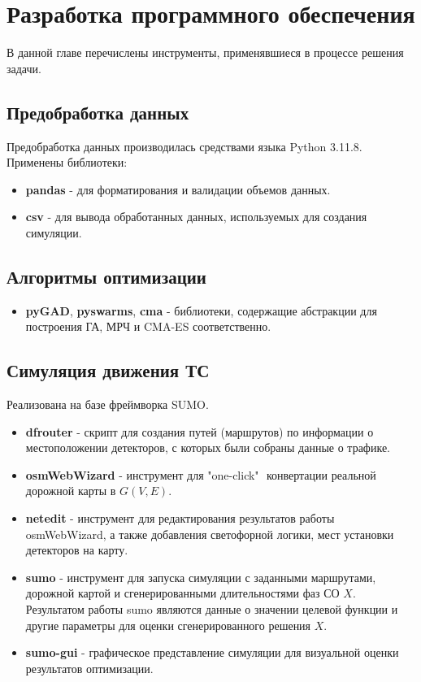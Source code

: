 \chapter{Разработка программного обеспечения} \label{ch3}

В данной главе перечислены инструменты, применявшиеся в процессе решения задачи.
\section{Предобработка данных}
Предобработка данных производилась средствами языка Python 3.11.8.
Применены библиотеки:
\begin{itemize}
	\item \textbf{pandas} - для форматирования и валидации объемов данных.
	\item \textbf{csv} - для вывода обработанных данных, используемых для создания симуляции.
\end{itemize}
\section{Алгоритмы оптимизации}
\begin{itemize}
	\item \textbf{pyGAD}, \textbf{pyswarms}, \textbf{cma} - библиотеки, содержащие абстракции для построения ГА, МРЧ и CMA-ES соответственно.
\end{itemize}
\section{Симуляция движения ТС}
Реализована на базе фреймворка SUMO.
\begin{itemize}
	\item \textbf{dfrouter} - скрипт для создания путей (маршрутов) по информации о местоположении детекторов, с которых были собраны данные о трафике.
	\item \textbf{osmWebWizard} - инструмент для "one-click" $ $ конвертации реальной дорожной карты в $G(V, E)$.
	\item \textbf{netedit} - инструмент для редактирования результатов работы osmWebWizard, а также добавления светофорной логики, мест установки детекторов на карту.
	\item \textbf{sumo} - инструмент для запуска симуляции с заданными маршрутами, дорожной картой и сгенерированными длительностями фаз СО $X$. Результатом работы sumo являются данные о значении целевой функции и другие параметры для оценки сгенерированного решения $X$.
	\item \textbf{sumo-gui} - графическое представление симуляции для визуальной оценки результатов оптимизации.
	
\end{itemize}

